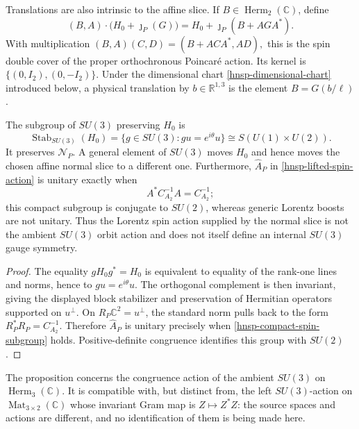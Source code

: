 Translations are also intrinsic to the affine slice.  If
\(B\in\operatorname{Herm}_2(\mathbb C)\), define
\begin{equation}
 (B,A)\cdot\bigl(H_0+\jmath_P(G)\bigr)
 =H_0+\jmath_P(B+AGA^*).
 \label{hnsp-poincare-action}
\end{equation}
With multiplication
\(
 (B,A)(C,D)=(B+ACA^*,AD),
\)
this is the spin double cover of the proper orthochronous Poincar\'e action.
Its kernel is \(\{(0,I_2),(0,-I_2)\}\).
Under the dimensional chart \eqref{hnsp-dimensional-chart} introduced below,
a physical translation by \(b\in\mathbb R^{1,3}\) is the element
\(B=G(b/\ell)\).

\begin{proposition}
\label{hnsp-su3-distinction}
The subgroup of \(SU(3)\) preserving \(H_0\) is
\begin{equation}
 \operatorname{Stab}_{SU(3)}(H_0)
 =\{g\in SU(3):gu=e^{i\theta}u\}
 \cong S(U(1)\times U(2)).
 \label{hnsp-su3-stabilizer}
\end{equation}
It preserves \(\mathcal N_P\).  A general element of \(SU(3)\) moves
\(H_0\) and hence moves the chosen affine normal slice to a different one.
Furthermore, \(\widehat A_P\) in \eqref{hnsp-lifted-spin-action} is unitary
exactly when
\begin{equation}
 A^*C_{A_2}^{-1}A=C_{A_2}^{-1};
 \label{hnsp-compact-spin-subgroup}
\end{equation}
this compact subgroup is conjugate to \(SU(2)\), whereas generic Lorentz
boosts are not unitary.  Thus the Lorentz spin action supplied by the normal
slice is not the ambient \(SU(3)\) orbit action and does not itself define an
internal \(SU(3)\) gauge symmetry.
\end{proposition}

\begin{proof}
The equality \(gH_0g^*=H_0\) is equivalent to equality of the rank-one
lines and norms, hence to \(gu=e^{i\theta}u\).  The orthogonal complement is
then invariant, giving the displayed block stabilizer and preservation of
Hermitian operators supported on \(u^\perp\).  On
\(R_P\mathbb C^2=u^\perp\), the standard norm pulls back to the form
\(R_P^*R_P=C_{A_2}^{-1}\).  Therefore \(\widehat A_P\) is unitary precisely
when \eqref{hnsp-compact-spin-subgroup} holds.  Positive-definite congruence
identifies this group with \(SU(2)\).
\end{proof}

The proposition concerns the congruence action of the ambient \(SU(3)\) on
\(\operatorname{Herm}_3(\mathbb C)\).  It is compatible with, but distinct
from, the left \(SU(3)\)-action on
\(\operatorname{Mat}_{3\times2}(\mathbb C)\) whose invariant Gram map is
\(Z\mapsto Z^*Z\): the source spaces and actions are different, and no
identification of them is being made here.

